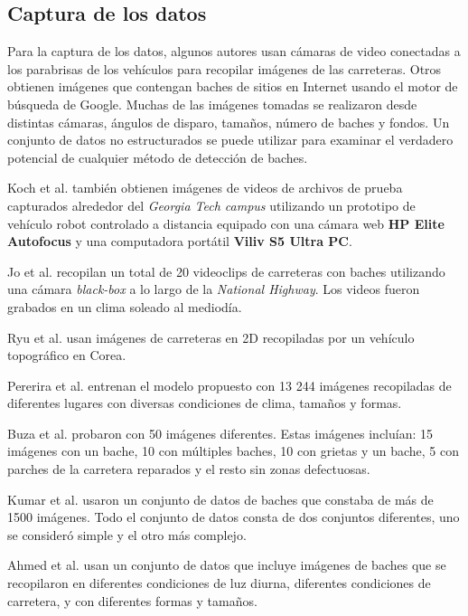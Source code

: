 	\subsection{Captura de los datos}
	Para la captura de los datos, algunos autores usan cámaras de video conectadas a los  parabrisas de los vehículos para 
	recopilar imágenes de las carreteras. Otros obtienen imágenes que contengan baches de  sitios en 
	Internet usando el motor de búsqueda de Google. Muchas de las imágenes tomadas 
	se realizaron desde distintas cámaras, ángulos de disparo, tamaños, número de baches y fondos. Un conjunto de datos no estructurados se puede utilizar para examinar el verdadero potencial de cualquier método de 
	detección de baches.

	Koch et al. también obtienen  imágenes de videos de archivos de prueba capturados alrededor 
	del \emph{Georgia Tech campus} utilizando un prototipo de vehículo robot controlado a distancia equipado con una cámara web 
	\textbf{HP Elite Autofocus} y una computadora portátil \textbf{Viliv S5 Ultra PC}. 

	Jo et al.  recopilan un total de 20 videoclips de carreteras con baches utilizando una cámara 
	\emph{black-box}  a lo largo de la \emph{National Highway}. Los videos fueron grabados en un clima soleado al mediodía.

	Ryu et al. usan imágenes de carreteras en 2D recopiladas por un vehículo topográfico
	en Corea. 

	Pererira et al. entrenan el modelo propuesto  con 13 244 imágenes recopiladas de diferentes
	lugares con diversas condiciones de clima, tamaños y formas.

	Buza et al. probaron con 50 imágenes diferentes. Estas imágenes incluían: 15 imágenes con un bache, 10 con
	múltiples baches, 10 con grietas y un bache, 5 con parches de la carretera reparados y el resto sin zonas defectuosas.

	Kumar et al. usaron un conjunto de datos de baches que constaba de más de 1500 imágenes.
	Todo el conjunto de datos consta de dos conjuntos diferentes, uno se consideró simple y el otro más complejo.

	Ahmed et al. usan un conjunto de datos que incluye imágenes de baches que se recopilaron en diferentes condiciones de luz 
	diurna, diferentes condiciones de carretera, y con diferentes formas y tamaños.



